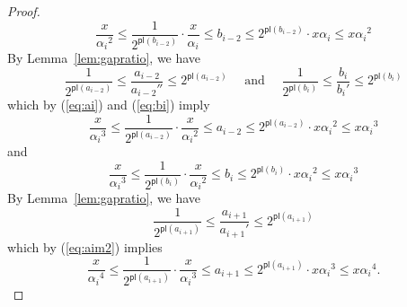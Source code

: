 \documentclass[11pt]{article}
\newcommand{\ens}[1]{\ensuremath{#1}}
\newcommand{\agap}[1]{\ensuremath{a_{#1}}}
\newcommand{\bgap}[1]{\ensuremath{b_{#1}}}
\newcommand{\leftof}[1]{\ensuremath{\gap #1'}}
\newcommand{\rightof}[1]{\ensuremath{\gap #1''}}
\newcommand{\gap}[1]{\ensuremath{#1}}
\newcommand{\potlossa}[1]{\ens{\mathsf{pl}(\agap{#1})}}
\newcommand{\potlossb}[1]{\ens{\mathsf{pl}(\bgap{#1})}}
\newcommand{\maxpotlossa}[1]{\ensuremath{\alpha_{#1}}}
\begin{document}
\begin{proof}
\begin{equation}
\label{eq:bi} 
\frac{x}{\maxpotlossa i^2}\leq\frac{1}{2^{\potlossb{i-2}}}\cdot\frac{x}{\maxpotlossa i}\leq b_{i-2} \leq 2^{\potlossb{i-2}} \cdot x\maxpotlossa i  \leq x \maxpotlossa i^2 
\end{equation} 
By Lemma~\ref{lem:gapratio}, we have 
\[ 
\frac{1}{2^{\potlossa{i-2}}} \leq \frac{a_{i-2}}{\rightof{a_{i-2}}} \leq 2^{\potlossa{i-2}} 
\quad \mbox{ and }\quad 
\frac{1}{2^{\potlossb{i}}} \leq \frac{b_{i}}{\leftof{b_{i}}} \leq 2^{\potlossb{i}} 
\] 
which by (\ref{eq:ai}) and (\ref{eq:bi}) imply 
\begin{equation} 
\label{eq:aim2} 
\frac{x}{\maxpotlossa i^3}\leq\frac{1}{2^{\potlossa{i-2}}}\cdot\frac{x}{\maxpotlossa i^2} \leq a_{i-2} \leq 2^{\potlossa{i-2}}\cdot x\maxpotlossa i^2 \leq x \maxpotlossa i^3 
\end{equation} 
and 
\begin{equation} 
\label{eq:bim2}
\frac{x}{\maxpotlossa i^3}\leq\frac{1}{2^{\potlossb{i}}}\cdot\frac{x}{\maxpotlossa i^2} \leq b_{i} \leq 2^{\potlossb{i}}\cdot x\maxpotlossa i^2 \leq x \maxpotlossa i^3 
\end{equation} 
By Lemma~\ref{lem:gapratio}, we have 
\[ 
\frac{1}{2^{\potlossa{i+1}}} \leq \frac{a_{i+1}}{\leftof{a_{i+1}}} \leq 2^{\potlossa{i+1}} 
\] 
which by (\ref{eq:aim2}) implies 
\begin{equation} 
\label{eq:aip1} 
\frac{x}{\maxpotlossa i^4}\leq\frac{1}{2^{\potlossa{i+1}}}\cdot\frac{x}{\maxpotlossa i^3}\leq a_{i+1} \leq 2^{\potlossa{i+1}} \cdot x\maxpotlossa i^3  \leq x \maxpotlossa i^4. 
\end{equation} 



\end{proof}
\end{document}
